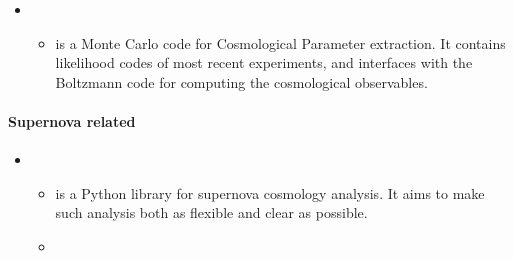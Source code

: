 \documentclass[letterpaper,10pt,english]{sphinxmanual}
\begin{document}
\begin{itemize}
\begin{itemize}
\end{itemize}

\item {} 
\begin{itemize}
\item {} 
 is a Monte Carlo code for Cosmological Parameter
extraction. It contains likelihood codes of most recent
experiments, and interfaces with the Boltzmann code  for
computing the cosmological observables.

\end{itemize}

\end{itemize}


\paragraph{Supernova related}
\label{\detokenize{resource/astro/topics/cosmology_tools:supernova-related}}\begin{itemize}
\item {} 
\begin{itemize}
\item {} 
 is a Python library for supernova cosmology analysis.
It aims to make such analysis both as flexible and clear as
possible. 

\item {} 

\end{itemize}

\end{itemize}
\end{document}

